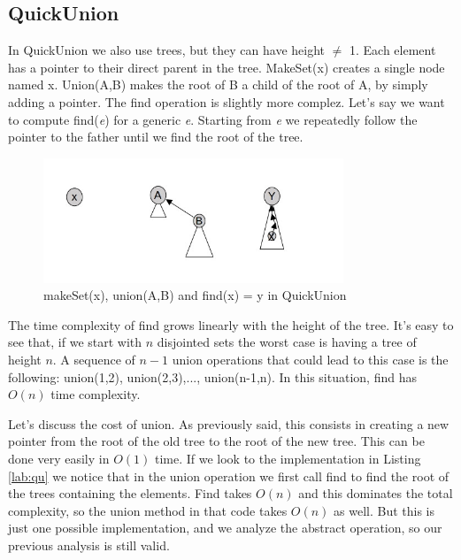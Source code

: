 \documentclass{article}
\begin{document}
\subsection{QuickUnion} \label{QU}
In QuickUnion we also use trees, but they can have height $\neq$ 1. Each element has a pointer to their
direct parent in the tree. MakeSet(x) creates a single node named x. Union(A,B) makes the root of B a child of the 
root of A, by simply adding a pointer. The find operation is slightly more complez. Let's say
we want to compute find(\emph{e}) for a generic \emph{e}. Starting from \emph{e} we repeatedly 
follow the pointer to the father until we find the root of the tree.
\begin{figure}[h!]
    \centering
    \includegraphics[width=0.8\textwidth]  {img/uf.jpg}
    \caption{makeSet(x), union(A,B) and find(x) = y in QuickUnion}
    \label{fig:quickUnion}
\end{figure}

The time complexity of find grows linearly with the height of the tree. It's easy to see
that, if we start with $n$ disjointed sets the worst case is having a tree of height $n$. A sequence
of $n-1$ union operations that could lead to this case is the following: union(1,2), union(2,3),..., union(n-1,n).
In this situation, find has $O(n)$ time complexity. 
\begin{center}
     
\end{center}
Let's discuss the cost of union. As previously said,
this consists in creating a new pointer from the root of the old tree to the root of the new tree. This can be done 
very easily in $O(1)$ time. If we look to the implementation in Listing \ref{lab:qu} we notice
that in the union operation we first call find to find the root of the trees containing the elements. Find takes $O(n)$ and this dominates the 
total complexity, so the union method in that code takes $ O(n)$ as well. But this is just one possible implementation, and we analyze
the abstract operation, so our previous analysis is still valid. 
\end{document}
